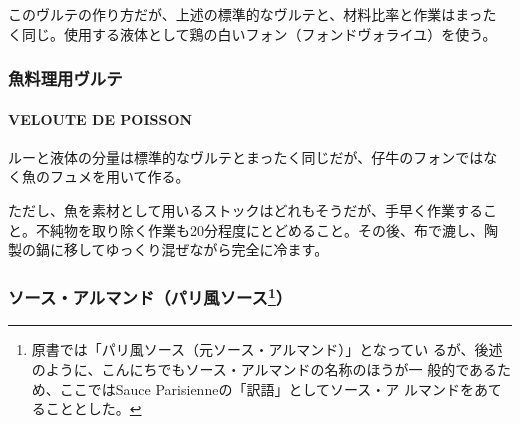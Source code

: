 \begin{recette}
 

このヴルテの作り方だが、上述の標準的なヴルテと、材料比率と作業はまった
く同じ。使用する液体として鶏の白いフォン（フォンドヴォライユ）を使う。

\maeaki

\hypertarget{ux9b5aux6599ux7406ux7528ux30f4ux30ebux30c6}{%
\subsubsection{魚料理用ヴルテ}\label{ux9b5aux6599ux7406ux7528ux30f4ux30ebux30c6}}

\hypertarget{veloute-de-poisson}{%
\paragraph{VELOUTE DE POISSON}\label{veloute-de-poisson}}

   

ルーと液体の分量は標準的なヴルテとまったく同じだが、仔牛のフォンではな
く魚のフュメを用いて作る。

ただし、魚を素材として用いるストックはどれもそうだが、手早く作業するこ
と。不純物を取り除く作業も20分程度にとどめること。その後、布で漉し、陶
製の鍋に移してゆっくり混ぜながら完全に冷ます。

\maeaki

\hypertarget{ux30bdux30fcux30b9ux30a2ux30ebux30deux30f3ux30c9ux30d1ux30eaux98a8ux30bdux30fcux30b9102024}{%
\subsubsection[ソース・アルマンド（パリ風ソース）]{\texorpdfstring{ソース・アルマンド（パリ風ソース\footnote{原書では「パリ風ソース（元ソース・アルマンド）」となってい
  るが、後述のように、こんにちでもソース・アルマンドの名称のほうが一
  般的であるため、ここではSauce Parisienneの「訳語」としてソース・ア
  ルマンドをあてることとした。}）}{ソース・アルマンド（パリ風ソース）}}\label{ux30bdux30fcux30b9ux30a2ux30ebux30deux30f3ux30c9ux30d1ux30eaux98a8ux30bdux30fcux30b9102024}}


\end{recette}
